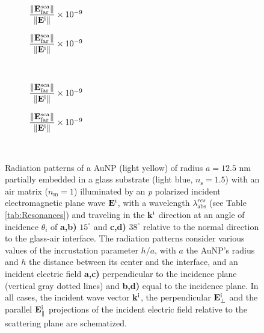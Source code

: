 \begin{figure}[b!]
    \centering
    \def\svgwidth{.8\textwidth}
    \\[-16.5em]
    \hspace*{-.2\textwidth}%
        \begin{subfigure}{.375\textwidth}\caption{%
                    \footnotesize$\dfrac{\norm{\vb{E}^\text{sca}_\text{far}}}{\norm{\vb{E}^\text{i}}} \times 10^{-9}$  }\label{sfig:Far:Inc:p1:a}\end{subfigure}%
        \begin{subfigure}{.4\textwidth}\caption{%
                    \footnotesize$\dfrac{\norm{\vb{E}^\text{sca}_\text{far}}}{\norm{\vb{E}^\text{i}}} \times 10^{-9}$  }\label{sfig:Far:Inc:p1:b}\end{subfigure}\\[13.75em]
    \def\svgwidth{.8\textwidth}
    \hspace*{-.21\textwidth}%
    \vspace*{-.7em}%
        \begin{subfigure}{.4\textwidth}\caption{%
                    \footnotesize$\dfrac{\norm{\vb{E}^\text{sca}_\text{far}}}{\norm{\vb{E}^\text{i}}} \times 10^{-9}$  }\label{sfig:Far:Inc:p1:c}\end{subfigure}%
        \begin{subfigure}{.4\textwidth}\caption{%
                    \footnotesize$\dfrac{\norm{\vb{E}^\text{sca}_\text{far}}}{\norm{\vb{E}^\text{i}}} \times 10^{-9}$  }\label{sfig:Far:Inc:p1:d}\end{subfigure}\\
    \caption[  Radiation pattern of a AuNP supported on a substrate illuminated at oblique incidence ]{
    Radiation patterns of a AuNP (light yellow) of radius $a = 12.5$ nm partially embedded in a glass substrate (light blue, $n_\text{s} = 1.5$) with an air matrix ($n_\text{m} = 1$) illuminated by an \textit{p} polarized incident electromagnetic plane wave $\vb{E}^\text{i}$, with a wavelength $\lambda_\text{abs}^{res}$ (see Table \ref{tab:Resonances}) and traveling in the $\vb{k}^\text{i}$ direction at an angle of incidence $\theta_i$ of \textbf{a,b)} $15^\circ$ and \textbf{c,d)} $38^\circ$ relative to the normal direction to the glass-air interface. The radiation patterns consider various values of the incrustation parameter $h/a$, with $a$ the AuNP's radius and $h$ the distance between its center and the interface, and an  incident electric field \textbf{a,c)} perpendicular to the incidence plane (vertical gray dotted lines) and \textbf{b,d)} equal to the incidence plane. In all cases, the incident wave vector $\vb{k}^\text{i}$, the perpendicular $\vb{E}_\perp^\text{i}$ and the  parallel $\vb{E}_\parallel^\text{i}$ projections of the incident electric field relative to the scattering plane are schematized.%
    }
    \label{fig:Far:Inc:p1}
\end{figure}

